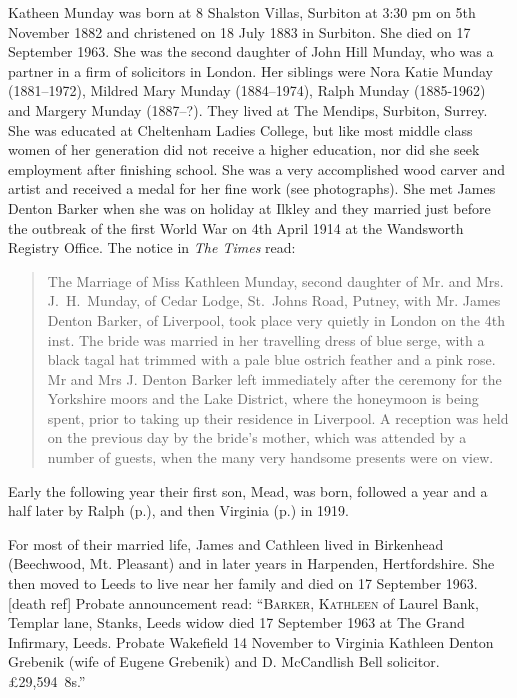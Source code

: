 
Katheen Munday was born at 8 Shalston Villas, Surbiton at 3:30 pm on 5th November 1882\cite{JHMtree, KMbirthCert, JHMbible} and christened on 18 July 1883 in Surbiton. She died on 17 September 1963. She was the second daughter of John Hill Munday, who was a partner in a firm of solicitors in London. Her siblings were Nora Katie Munday (1881--1972), Mildred Mary Munday (1884--1974), Ralph Munday (1885-1962) and Margery Munday (1887--?). They lived at The Mendips, Surbiton, Surrey.  She was educated at Cheltenham Ladies College, but like most middle class women of her generation did not receive a higher education, nor did she seek employment after finishing school. She was a very accomplished wood carver and artist and received a medal for her fine work (see photographs). She met James Denton Barker when she was on holiday at Ilkley and they married just before the outbreak of the first World War on 4th April 1914 at the Wandsworth Registry Office.\cite{KathleenJamesWeddingIndex} The notice in \emph{The Times} read:

\begin{quotation}
The Marriage of Miss Kathleen Munday, second daughter of Mr. and Mrs. J.\ H.\ Munday, of Cedar Lodge, St.\ Johns Road, Putney, with Mr. James Denton Barker, of Liverpool, took place very quietly in London on the 4th inst. The bride was married in her travelling dress of blue serge, with a black tagal hat trimmed with a pale blue ostrich feather and a pink rose. Mr and Mrs J. Denton Barker left immediately after the ceremony for the Yorkshire moors and the Lake District, where the honeymoon is being spent, prior to taking up their residence in Liverpool. A reception was held on the previous day by the bride's mother, which was attended by a number of guests, when the many very handsome presents were on view.
\end{quotation}

Early the following year their first son, Mead, was born, followed a year and a half later by Ralph (p.\pageref{Ralph_Munday_Denton-Barker}), and then Virginia (p.\pageref{Virginia_Kathleen_Denton_Barker}) in 1919.

For most of their married life, James and Cathleen lived in Birkenhead (Beechwood, Mt. Pleasant) and in later years in Harpenden, Hertfordshire. She then moved to Leeds to live near her family and died on 17 September 1963.[death ref] Probate announcement read: ``\textsc{Barker, Kathleen} of Laurel Bank, Templar lane, Stanks, Leeds widow died 17 September 1963 at The Grand Infirmary, Leeds. Probate Wakefield 14 November to Virginia Kathleen Denton Grebenik (wife of Eugene Grebenik) and D. McCandlish Bell solicitor. \pounds29,594~8s.''
